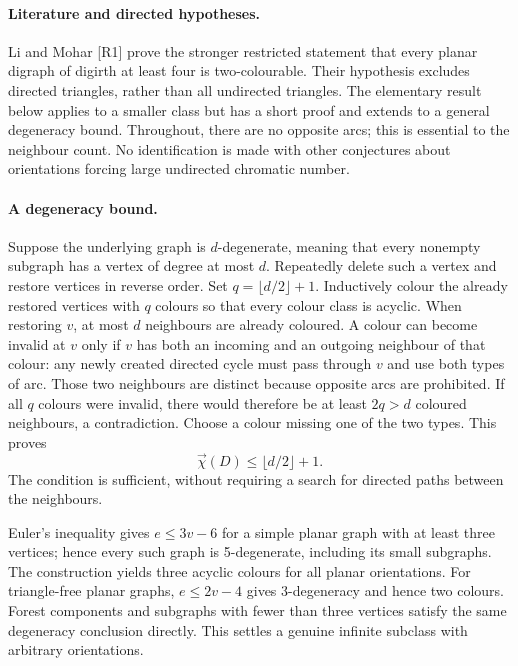 \documentclass[11pt,a4paper]{article}
\begin{document}
\paragraph{Literature and directed hypotheses.}
Li and Mohar [R1] prove the stronger restricted statement that every
planar digraph of digirth at least four is two-colourable. Their
hypothesis excludes directed triangles, rather than all undirected
triangles. The elementary result below applies to a smaller class but
has a short proof and extends to a general degeneracy bound. Throughout,
there are no opposite arcs; this is essential to the neighbour count.
No identification is made with other conjectures about orientations
forcing large undirected chromatic number.

\paragraph{A degeneracy bound.}
Suppose the underlying graph is $d$-degenerate, meaning that every
nonempty subgraph has a vertex of degree at most $d$. Repeatedly delete
such a vertex and restore vertices in reverse order. Set
$q=\lfloor d/2\rfloor+1$. Inductively colour the already restored
vertices with $q$ colours so that every colour class is acyclic.
When restoring $v$, at most $d$ neighbours are already coloured.
A colour can become invalid at $v$ only if $v$ has both an incoming and
an outgoing neighbour of that colour: any newly created directed cycle
must pass through $v$ and use both types of arc. Those two neighbours
are distinct because opposite arcs are prohibited. If all $q$ colours
were invalid, there would therefore be at least $2q>d$ coloured
neighbours, a contradiction. Choose a colour missing one of the two
types. This proves
\[
             \vec\chi(D)\le \lfloor d/2\rfloor+1.
\]
The condition is sufficient, without requiring a search for directed
paths between the neighbours.

Euler's inequality gives $e\le3v-6$ for a simple planar graph with at
least three vertices; hence every such graph is 5-degenerate, including
its small subgraphs. The construction yields three acyclic colours for
all planar orientations. For triangle-free planar graphs,
$e\le2v-4$ gives 3-degeneracy and hence two colours. Forest components
and subgraphs with fewer than three vertices satisfy the same
degeneracy conclusion directly. This settles a genuine infinite
subclass with arbitrary orientations.
\end{document}
